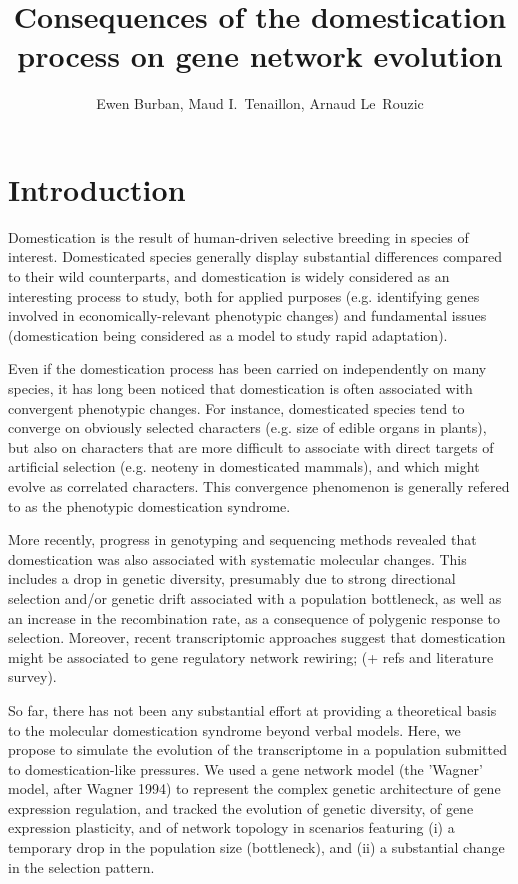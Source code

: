 \documentclass[12pt]{article}
\title{Consequences of the domestication process on gene network evolution}
\author{Ewen Burban, Maud I.\ Tenaillon, Arnaud Le~Rouzic}
\begin{document}
\maketitle

\section{Introduction}

Domestication is the result of human-driven selective breeding in species of interest. Domesticated species generally display substantial differences compared to their wild counterparts, and domestication is widely considered as an interesting process to study, both for applied purposes (e.g. identifying genes involved in economically-relevant phenotypic changes) and fundamental issues (domestication being considered as a model to study rapid adaptation).

Even if the domestication process has been carried on independently on many species, it has long been noticed that domestication is often associated with convergent phenotypic changes. For instance, domesticated species tend to converge on obviously selected characters (e.g. size of edible organs in plants), but also on characters that are more difficult to associate with direct targets of artificial selection (e.g. neoteny in domesticated mammals), and which might evolve as correlated characters. This convergence phenomenon is generally refered to as the phenotypic domestication syndrome. 

More recently, progress in genotyping and sequencing methods revealed that domestication was also associated with systematic molecular changes. This includes a drop in genetic diversity, presumably due to strong directional selection and/or genetic drift associated with a population bottleneck, as well as an increase in the recombination rate, as a consequence of polygenic response to selection. Moreover, recent transcriptomic approaches suggest that domestication might be associated to gene regulatory network rewiring; (+ refs and literature survey).

So far, there has not been any substantial effort at providing a theoretical basis to the molecular domestication syndrome beyond verbal models. Here, we propose to simulate the evolution of the transcriptome in a population submitted to domestication-like pressures. We used a gene network model (the 'Wagner' model, after Wagner 1994) to represent the complex genetic architecture of gene expression regulation, and tracked the evolution of genetic diversity, of gene expression plasticity, and of network topology in scenarios featuring (i) a temporary drop in the population size (bottleneck), and (ii) a substantial change in the selection pattern. 
\end{document}
